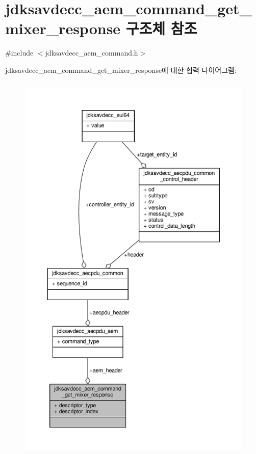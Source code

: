 \hypertarget{structjdksavdecc__aem__command__get__mixer__response}{}\section{jdksavdecc\+\_\+aem\+\_\+command\+\_\+get\+\_\+mixer\+\_\+response 구조체 참조}
\label{structjdksavdecc__aem__command__get__mixer__response}


{\ttfamily \#include $<$jdksavdecc\+\_\+aem\+\_\+command.\+h$>$}



jdksavdecc\+\_\+aem\+\_\+command\+\_\+get\+\_\+mixer\+\_\+response에 대한 협력 다이어그램\+:
\nopagebreak
\begin{figure}[H]
\begin{center}
\leavevmode
\includegraphics[height=550pt]{structjdksavdecc__aem__command__get__mixer__response__coll__graph}
\end{center}
\end{figure}
